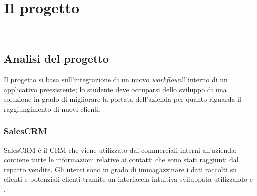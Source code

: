 \chapter{Il progetto}
\label{cap:descrizione-stage}

\\

\section{Analisi del progetto}

Il progetto si basa sull'integrazione di un nuovo \emph{workflow}\glsfirstoccur all'interno di un applicativo preesistente; lo studente deve occuparsi dello sviluppo di una soluzione in grado di migliorare la portata dell'azienda per quanto riguarda il raggiungimento di nuovi clienti.

\subsection{SalesCRM}
SalesCRM è il CRM che viene utilizzato dai commerciali interni all'azienda; contiene tutte le informazioni relative ai contatti che sono stati raggiunti dal reparto vendite. 
Gli utenti sono in grado di immagazzinare i dati raccolti su clienti e potenziali clienti tramite un interfaccia intuitiva sviluppata utilizzando  e .

